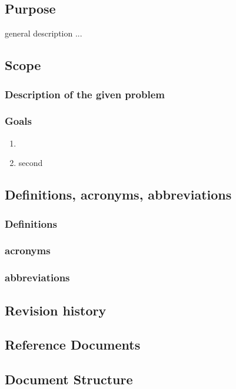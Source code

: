 

\subsection{Purpose}
general description ...

\subsection{Scope}

\subsubsection{Description of the given problem}
\subsubsection{Goals}
\begin{enumerate}[label=E]
  \item
  \item second
\end{enumerate}



\subsection{Definitions,  acronyms,  abbreviations}
\subsubsection{Definitions}
\subsubsection{acronyms}
\subsubsection{abbreviations}


\subsection{Revision history}


\subsection{Reference Documents}


\subsection{Document Structure}
